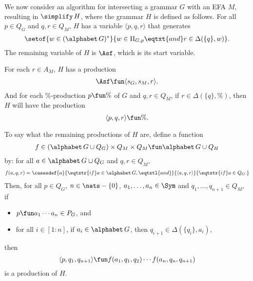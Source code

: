 We now consider an algorithm for intersecting a grammar $G$ with an
EFA $M$, resulting in $\simplify\,H$, where the grammar $H$ is defined
as follows.
For all $p\in Q_G$ and $q, r\in Q_M$, $H$ has a variable
$\langle p,q,r\rangle$ that generates
\begin{gather*}
\setof{w\in(\alphabet\,G)^*}{w\in\Pi_{G,p} \eqtxt{and}
 r\in\Delta(\{q\},w)} .
\end{gather*}
The remaining variable of $H$ is $\Asf$, which is its start variable.

For each $r\in A_M$, $H$ has a production
\begin{gather*}
  \Asf \fun \langle s_G, s_M, r\rangle .
\end{gather*}
And for each $\%$-production $p\fun\%$ of $G$ and $q,r\in Q_M$, if
$r\in \Delta(\{q\}, \%)$,
then $H$ will have the production
\begin{gather*}
  \langle p,q,r\rangle \fun \% .
\end{gather*}

To say what the remaining productions of $H$ are, define
a function
\begin{gather*}
f \in (\alphabet\,G \cup Q_G) \times Q_M \times Q_M\fun
\alphabet\,G\cup Q_H
\end{gather*}
by: for all $a\in\alphabet\,G \cup Q_G$ and $q,r\in Q_M$,
\begin{gather*}
  f(a, q, r) =
  \casesdef{a}{\eqtxtr{if} a\in\alphabet\,G , \eqtxtl{and}}%
  {\langle a,q,r\rangle}{\eqtxtr{if} a\in Q_G .}
\end{gather*}
Then, for all $p\in Q_G$, $n\in\nats-\{0\}$,
$a_1,\ldots,a_n\in\Sym$ and $q_1,\ldots,q_{n+1}\in Q_M$, if
\begin{itemize}
\item $p\fun a_1\cdots a_n\in P_G$, and

\item for all $i\in[1:n]$, if $a_i\in\alphabet\,G$, then
  $q_{i+1}\in\Delta(\{q_i\},a_i)$,
\end{itemize}
then
\begin{gather*}
  \langle p,q_1,q_{n+1}\rangle \fun 
  f(a_1,q_1,q_2) \cdots f(a_n,q_n,q_{n+1})
\end{gather*}
is a production of $H$.

